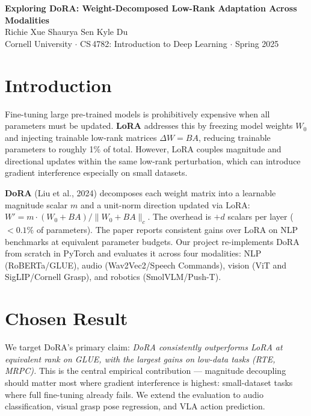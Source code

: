\documentclass[11pt]{article}
\begin{document}
\begin{center}
	{\large\textbf{Exploring DoRA: Weight-Decomposed Low-Rank Adaptation Across Modalities}}\\[4pt]
	Richie Xue \quad Shaurya Sen \quad Kyle Du\\
	Cornell University $\cdot$ CS\,4782: Introduction to Deep Learning $\cdot$ Spring 2025
\end{center}
\vspace{3pt}
\vspace{1pt}

\section{Introduction}

Fine-tuning large pre-trained models is prohibitively expensive when all parameters must be updated.
\textbf{LoRA} \cite{hu2022lora} addresses this by freezing model weights $W_0$ and injecting trainable low-rank matrices $\Delta W = BA$, reducing trainable parameters to roughly 1\% of total.
However, LoRA couples magnitude and directional updates within the same low-rank perturbation, which can introduce gradient interference especially on small datasets.

\textbf{DoRA} (Liu et al., 2024) \cite{liu2024dora} decomposes each weight matrix into a learnable magnitude scalar $m$ and a unit-norm direction updated via LoRA: $W' = m \cdot (W_0{+}BA)/\|W_0{+}BA\|_c$.
The overhead is $+d$ scalars per layer ($<0.1\%$ of parameters). The paper reports consistent gains over LoRA on NLP benchmarks at equivalent parameter budgets. Our project re-implements DoRA from scratch in PyTorch and evaluates it across four modalities: NLP (RoBERTa/GLUE), audio (Wav2Vec2/Speech Commands), vision (ViT and SigLIP/Cornell Grasp), and robotics (SmolVLM/Push-T).

\section{Chosen Result}

We target DoRA's primary claim: \emph{DoRA consistently outperforms LoRA at equivalent rank on GLUE, with the largest gains on low-data tasks (RTE, MRPC).}
This is the central empirical contribution — magnitude decoupling should matter most where gradient interference is highest: small-dataset tasks where full fine-tuning already fails.
We extend the evaluation to audio classification, visual grasp pose regression, and VLA action prediction.
\end{document}
